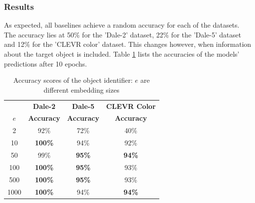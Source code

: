 \subsubsection*{Results}
As expected, all baselines achieve a random accuracy for each of the datasets.
The accuracy lies at 50\% for the 'Dale-2' dataset, 22\% for the 'Dale-5' dataset and 12\% for the 'CLEVR color' dataset.
This changes however, when information about the target object is included.
Table \ref{tab:results_bounding_box_classifier} lists the accuracies of the models' predictions after 10 epochs.

\begin{table}[ht]
    \centering
    \begin{tabular}{c|c|c|c}
        \toprule
               & \textbf{Dale-2}   & \textbf{Dale-5}   & \textbf{CLEVR Color} \\\cmidrule(lr){2-2}\cmidrule(lr){3-3}\cmidrule(lr){4-4}
        $e$    & \textbf{Accuracy} & \textbf{Accuracy} & \textbf{Accuracy}    \\\midrule
        {2}    & {92\%}            & {72\%}            & {40\%}               \\
        {10}   & \textbf{100\%}    & {94\%}            & {92\%}               \\
        {50}   & {99\%}            & \textbf{95\%}     & \textbf{94\%}        \\
        {100}  & \textbf{100\%}    & \textbf{95\%}     & {93\%}               \\
        {500}  & \textbf{100\%}    & \textbf{95\%}     & {93\%}               \\
        {1000} & \textbf{100\%}    & {94\%}            & \textbf{94\%}        \\
        \bottomrule
    \end{tabular}
    \caption{Accuracy scores of the object identifier: $e$ are different embedding sizes}
    \label{tab:results_bounding_box_classifier}
\end{table}

